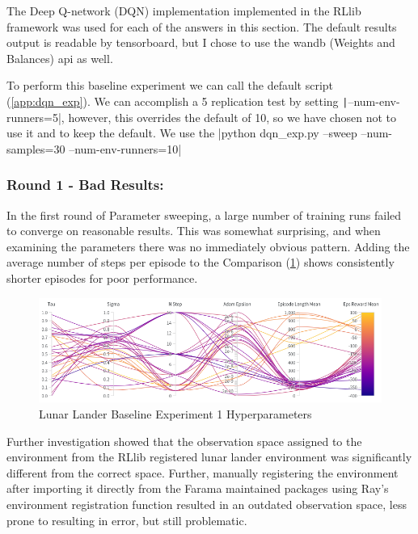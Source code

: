 \documentclass[12pt,letterpaper]{exam}
\begin{document}
\begin{questions}
\setcounter{question}{0}
	\question
	The Deep Q-network (DQN) implementation \cite{mnih2013,mnih2015}
	implemented in the RLlib framework \cite{liaw2018tune} was used for 
	each of the answers in this section.
	The default results output is readable by tensorboard, 
	but I chose to use the wandb (Weights and Balances) api as well.
	
	To perform this baseline experiment we can call the default script
	(\cref{app:dqn_exp}). We can accomplish a 5 replication test by setting
	\texttt|--num-env-runners=5|, however, this overrides the 
	default of 10, so we have chosen not to use it and to keep the default.
	We use the 
	|python dqn_exp.py --sweep --num-samples=30 --num-env-runners=10|

	\subsubsection*{Round 1 - Bad Results:}
	In the first round of Parameter sweeping, a large number of training runs
	failed to converge on reasonable results. This was somewhat surprising,
	and when examining the parameters there was no immediately obvious pattern.
	Adding the average number of steps per episode to the Comparison 
	(\cref{fig:baseline_1_para}) shows consistently shorter episodes for poor
	performance.
	\begin{figure}[b]
		\centering
		\includegraphics[width=.95\linewidth]{para_coord_baseline_1.png}
		\caption{Lunar Lander Baseline Experiment 1 Hyperparameters}
		\label{fig:baseline_1_para}
	\end{figure}
	Further investigation showed that the observation space assigned to the 
	environment from the RLlib registered lunar lander environment was
	significantly different from the correct space.
	Further, manually registering the environment after importing
	it directly from the Farama maintained packages using Ray's environment
	registration function resulted in an outdated observation space,
	less prone to resulting in error, but still problematic.


\end{questions}
\end{document}
